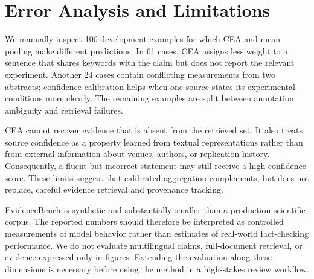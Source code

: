 \section{Error Analysis and Limitations}

We manually inspect 100 development examples for which CEA and mean pooling make
different predictions. In 61 cases, CEA assigns less weight to a sentence that shares
keywords with the claim but does not report the relevant experiment. Another 24 cases
contain conflicting measurements from two abstracts; confidence calibration helps when
one source states its experimental conditions more clearly. The remaining examples are
split between annotation ambiguity and retrieval failures.

CEA cannot recover evidence that is absent from the retrieved set. It also treats
source confidence as a property learned from textual representations rather than from
external information about venues, authors, or replication history. Consequently, a
fluent but incorrect statement may still receive a high confidence score. These limits
suggest that calibrated aggregation complements, but does not replace, careful evidence
retrieval and provenance tracking.

EvidenceBench is synthetic and substantially smaller than a production scientific
corpus. The reported numbers should therefore be interpreted as controlled measurements
of model behavior rather than estimates of real-world fact-checking performance. We do
not evaluate multilingual claims, full-document retrieval, or evidence expressed only
in figures. Extending the evaluation along these dimensions is necessary before using
the method in a high-stakes review workflow.
